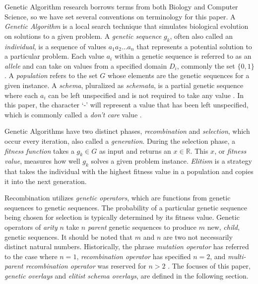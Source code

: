 Genetic Algorithm research borrows terms from both Biology and Computer Science, so we have set several conventions on terminology for this paper. A \emph{Genetic Algorithm} is a local search technique that simulates biological evolution on solutions to a given problem\cite{Russell10}. A \emph{genetic sequence} $g_k$, often also called an \emph{individual}, is a sequence of values $a_1 a_2\ldots a_n$ that represents a potential solution to a particular problem. Each value $a_i$ within a genetic sequence is referred to as an \emph{allele} and can take on values from a specified domain $D_i$, commonly the set $\{0,1\}$. A \emph{population} refers to the set $G$ whose elements are the genetic sequences for a given instance. A \emph{schema}, pluralized as \emph{schemata}, is a partial genetic sequence where each $a_i$ can be left unspecified and is not required to take any value \cite{Russell10}. In this paper, the character `-' will represent a value that has been left unspecified, which is commonly called a \emph{don't care} value \cite{Holland75}.

Genetic Algorithms have two distinct phases, \emph{recombination} and \emph{selection}, which occur every iteration, also called a \emph{generation}. During the selection phase, a \emph{fitness function} takes a $g_k \in G$ as input and returns an $x \in \mathbb{R}$. This $x$, or \emph{fitness value}, measures how well $g_k$ solves a given problem instance. \emph{Elitism} is a strategy that takes the individual with the highest fitness value in a population and copies it into the next generation.

Recombination utilizes \emph{genetic operators}, which are functions from genetic sequences to genetic sequences. The probability of a particular genetic sequence being chosen for selection is typically determined by its fitness value. Genetic operators of \emph{arity} $n$ take $n$ \emph{parent} genetic sequences to produce $m$ new, \emph{child}, genetic sequences. It should be noted that $m$ and $n$ are two not necessarily distinct natural numbers.  Historically, the phrase \emph{mutation operator} has referred to the case where $n = 1$, \emph{recombination operator} has specified $n = 2$, and \emph{multi-parent recombination operator} was reserved for $n > 2$ \cite{Eiben94}. The focuses of this paper, \emph{genetic overlays} and \emph{elitist schema overlays}, are defined in the following section.